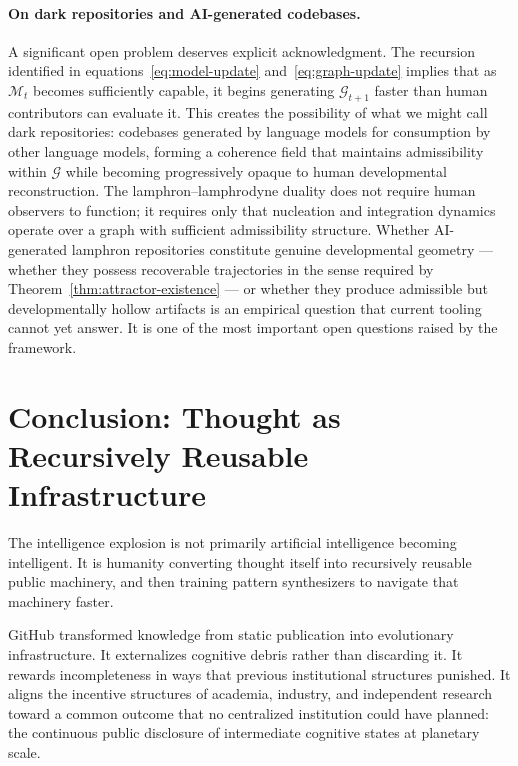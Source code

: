 \documentclass[11pt]{article}
\begin{document}
\paragraph{On dark repositories and AI-generated codebases.}
A significant open problem deserves explicit acknowledgment. The recursion
identified in equations~\eqref{eq:model-update} and~\eqref{eq:graph-update}
implies that as $\mathcal{M}_t$ becomes sufficiently capable, it begins
generating $\mathcal{G}_{t+1}$ faster than human contributors can evaluate
it. This creates the possibility of what we might call dark repositories:
codebases generated by language models for consumption by other language
models, forming a coherence field that maintains admissibility within
$\mathcal{G}$ while becoming progressively opaque to human developmental
reconstruction. The lamphron--lamphrodyne duality does not require human
observers to function; it requires only that nucleation and integration
dynamics operate over a graph with sufficient admissibility structure. Whether
AI-generated lamphron repositories constitute genuine developmental geometry ---
whether they possess recoverable trajectories in the sense required by
Theorem~\ref{thm:attractor-existence} --- or whether they produce admissible
but developmentally hollow artifacts is an empirical question that current
tooling cannot yet answer. It is one of the most important open questions
raised by the framework.

\section{Conclusion: Thought as Recursively Reusable Infrastructure}

The intelligence explosion is not primarily artificial intelligence becoming
intelligent. It is humanity converting thought itself into recursively reusable
public machinery, and then training pattern synthesizers to navigate that
machinery faster.

GitHub transformed knowledge from static publication into evolutionary
infrastructure. It externalizes cognitive debris rather than discarding it. It
rewards incompleteness in ways that previous institutional structures punished.
It aligns the incentive structures of academia, industry, and independent
research toward a common outcome that no centralized institution could have
planned: the continuous public disclosure of intermediate cognitive states at
planetary scale.
\end{document}
